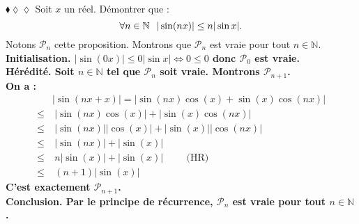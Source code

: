 \documentclass[11pt]{article}
\begin{document}
\begin{exercice}{$\blacklozenge\lozenge\lozenge$}{}
    Soit $x$ un réel. Démontrer que :
    \begin{equation*}
        \forall{n\in\mathbb{N}}\hspace{0.25cm} |\sin(nx)|\leq n|\sin x|.
    \end{equation*}
    \tcblower
    Notons $\mathcal{P}_n$ cette proposition. Montrons que $\mathcal{P}_n$ est vraie pour tout $n\in\mathbb{N}$.\\
    \bf{Initialisation}. $|\sin(0x)|\leq0|\sin x| \iff 0 \leq 0$ donc $\mathcal{P}_0$ est vraie.\\
    \bf{Hérédité}.
    Soit $n\in\mathbb{N}$ tel que $\mathcal{P}_n$ soit vraie. Montrons $\mathcal{P}_{n+1}$.\\
    On a :
    \begin{align*}
        &|\sin(nx+x)|=|\sin(nx)\cos(x)+\sin(x)\cos(nx)|\\
        \leq&~|\sin(nx)\cos(x)|+|\sin(x)\cos(nx)|\\
        \leq&~|\sin(nx)||\cos(x)|+|\sin(x)||\cos(nx)|\\
        \leq&~|\sin(nx)|+|\sin(x)|\\
        \leq&~n|\sin(x)|+|\sin(x)| \hspace{1cm}\text{(HR)}\\
        \leq&~(n+1)|\sin(x)|
    \end{align*} 
    C'est exactement $\mathcal{P}_{n+1}$.\\
    \bf{Conclusion.} Par le principe de récurrence, $\mathcal{P}_n$ est vraie pour tout $n\in\mathbb{N}$.
\end{exercice}
\end{document}
